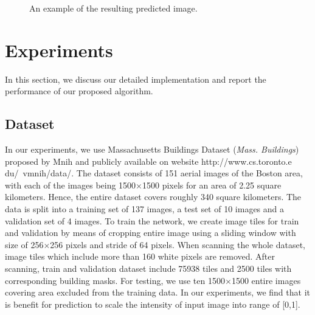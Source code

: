 \documentclass[runningheads]{llncs}
\begin{document}
\begin{figure}
\centering
{}	
\caption{ An example of the resulting predicted image.}
\label{fig:AGroupOfExamples}
\end{figure}


\section{Experiments}
In this section, we discuss our detailed implementation and report the performance of our proposed algorithm.

\subsection{Dataset}
   In our experiments, we use Massachusetts Buildings Dataset (\textit{Mass. Buildings}) proposed by Mnih \cite{Mnih2013Machine} and publicly available on website http://www.cs.toronto.e
du/~vmnih/data/. The dataset consists of 151 aerial images of the Boston area, with each of the images being 1500$\times$1500 pixels for an area of 2.25 square kilometers. Hence, the entire dataset covers roughly 340 square kilometers. The data is split into a training set of 137 images, a test set of 10 images and a validation set of 4 images. To train the network, we create image tiles for train and validation by means of cropping entire image using a sliding window with size of 256$\times$256 pixels and stride of 64 pixels. When scanning the whole dataset, image tiles which include more than 160 white pixels are removed. After scanning, train and validation dataset include 75938 tiles and 2500 tiles with corresponding building masks. For testing, we use ten 1500$\times$1500 entire images covering area excluded from the training data. In our experiments, we find that it is benefit for prediction to scale the intensity of input image into range of [0,1]. 
\end{document}
